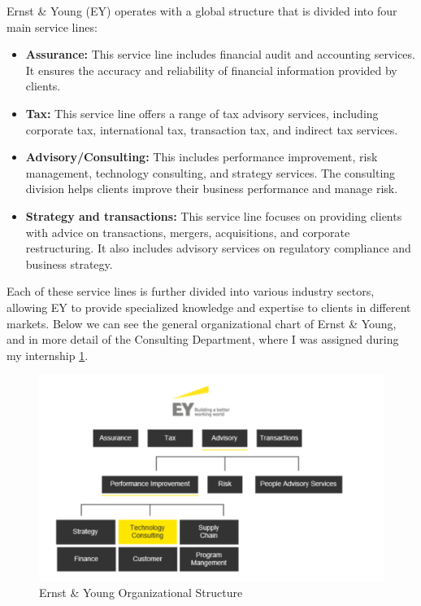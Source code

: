 Ernst \& Young (EY) operates with a global structure that is divided into four
main service lines:

\begin{itemize}
    \item \textbf{Assurance:} This service line includes financial audit and accounting services. It ensures the accuracy and reliability of financial information provided by clients.
    \item \textbf{Tax:} This service line offers a range of tax advisory services, including corporate tax, international tax, transaction tax, and indirect tax services.
    \item \textbf{Advisory/Consulting:} This includes performance improvement, risk management, technology consulting, and strategy services. The consulting division helps clients improve their business performance and manage risk.
    \item \textbf{Strategy and transactions:} This service line focuses on providing clients with advice on transactions, mergers, acquisitions, and corporate restructuring. It also includes advisory services on regulatory compliance and business strategy.
\end{itemize}

Each of these service lines is further divided into various industry sectors,
allowing EY to provide specialized knowledge and expertise to clients in
different markets. Below we can see the general organizational chart of
Ernst \& Young, and in more detail of the Consulting Department, where I was
assigned during my internship \ref{fig:ey-structure}.

\begin{figure}[H]
    \centering
    \includegraphics[width=\textwidth]{../figs/org_chart.pdf}
    \caption{Ernst \& Young Organizational Structure}
    \label{fig:ey-structure}
\end{figure}

